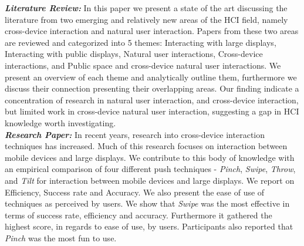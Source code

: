 \textit{\textbf{Literature Review:}} In this paper we present a state of the art discussing the literature from two emerging and relatively new areas of the HCI field, namely cross-device interaction and natural user interaction. 
Papers from these two areas are reviewed and categorized into 5 themes: Interacting with large displays, Interacting with public displays, Natural user interactions, Cross-device interactions, and Public space and cross-device natural user interactions. We present an overview of each theme and analytically outline them, furthermore we discuss their connection presenting their overlapping areas.  Our finding indicate a concentration of research in natural user interaction, and cross-device interaction, but limited work in cross-device natural user interaction, suggesting a gap in HCI knowledge worth investigating.\\

\textit{\textbf{Research Paper:}} In recent years, research into cross-device interaction techniques has increased. Much of this research focuses on interaction between mobile devices and large displays. We contribute to this body of knowledge with an empirical comparison of four different push techniques - \textit{Pinch}, \textit{Swipe}, \textit{Throw},  and \textit{Tilt} for interaction between mobile devices and large displays. We report on Efficiency, Success rate and Accuracy. We also present the ease of use of techniques as perceived by users. We show that \textit{Swipe} was the most effective in terms of success rate, efficiency and accuracy. Furthermore it gathered the highest score, in regards to ease of use, by users. Participants also reported that \textit{Pinch} was the most fun to use.